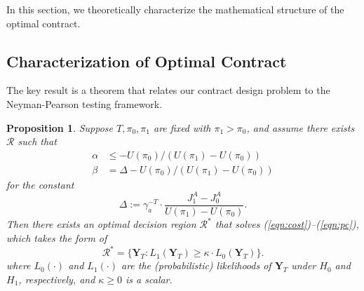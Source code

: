 \documentclass[letterpaper, 10 pt, conference]{ieeeconf}  %
\newtheorem{proposition}{Proposition}
\begin{document}
In this section, we theoretically characterize the mathematical structure of the optimal contract.

\subsection{Characterization of Optimal Contract}
The key result is a theorem that relates our contract design problem to the Neyman-Pearson testing framework. %

\begin{proposition}
\label{prop:optimality}
Suppose $T,\pi_0,\pi_1$ are fixed with $\pi_1 >  \pi_0$, and assume there exists $\mathcal{R}$ such that
\begin{align}
    \alpha &\leq - U(\pi_0)/(U(\pi_1)-U(\pi_0)) \label{eqn:alph}\\
    \beta &= \Delta - U(\pi_0)/(U(\pi_1)-U(\pi_0)) \label{eqn:beth}
\end{align}
for the constant
\begin{equation}
    \Delta := \gamma_a^{-T}\cdot\frac{J^A_1 - J^A_0}{U(\pi_1) - U(\pi_0)}.\label{eqn:Delta}
\end{equation} Then there exists an optimal decision region $\mathcal{R}^*$ that solves (\ref{eqn:cost})--(\ref{eqn:pc}), which takes the form of
\begin{equation}
\label{eqn:lrt}
    \mathcal{R}^* = \big\{\mathbf{Y}_T : L_1(\mathbf{Y}_T) \geq \kappa \cdot L_0(\mathbf{Y}_T)\big\}.
\end{equation}
where $L_0(\cdot)$ and $L_1(\cdot)$ are the (probabilistic) likelihoods of $\mathbf{Y}_T$ under $H_0$ and $H_1$, respectively, and $\kappa \geq 0$ is a scalar.
\end{proposition}
\end{document}
